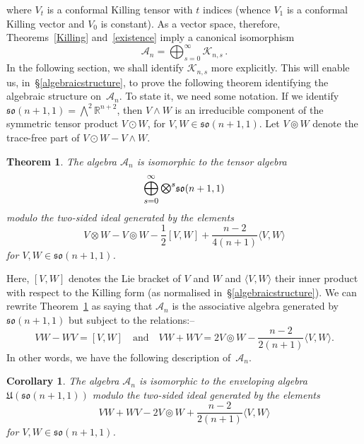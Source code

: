 \documentclass[a4paper,12pt]{amsart}
\newtheorem{thm}{Theorem}
\newtheorem{cor}{Corollary}
\newcommand{\topten}{\circledcirc}
\begin{document}
where $V_t$ is a conformal Killing tensor with $t$ indices (whence $V_1$ is a
conformal Killing vector and $V_0$ is constant). As a vector space, therefore,
Theorems~\ref{Killing} and~\ref{existence} imply a canonical isomorphism
$${\mathcal A}_n=\bigoplus_{s=0}^\infty\mathcal K_{n,s}\,.$$
In the following section, we shall identify ${\mathcal K}_{n,s}$ more
explicitly. This will enable us, in~\S\ref{algebraicstructure}, to prove the
following theorem identifying the algebraic structure on~${\mathcal A}_n$. To
state it, we need some notation. If we identify
${\mathfrak{so}}(n+1,1)=\bigwedge^2{\mathbb R}^{n+2}$, then $V\wedge W$ is an
irreducible component of the symmetric tensor product $V\odot W$, for
$V,W\in{\mathfrak{so}}(n+1,1)$. Let $V\topten W$ denote the trace-free part of
$V\odot W-V\wedge W$.
\begin{thm}\label{structure} The algebra ${\mathcal A}_n$ is isomorphic to the
tensor algebra
$$\mbox{\large$\displaystyle \bigoplus_{s=0}^\infty
\textstyle\bigotimes^s$}{\mathfrak{so}}(n+1,1)$$
modulo the two-sided ideal generated by the elements
\begin{equation}\label{generators}V\otimes W-V\topten W-\frac{1}{2}[V,W]
+\frac{n-2}{4(n+1)}\langle V,W\rangle\end{equation}
for $V,W\in{\mathfrak{so}}(n+1,1)$.
\end{thm}
\noindent Here, $[V,W]$ denotes the Lie bracket of $V$ and $W$ and
$\langle V,W\rangle$ their inner product with respect to the Killing form (as
normalised in~\S\ref{algebraicstructure}).
We can rewrite Theorem~\ref{structure} as saying that ${\mathcal A}_n$ is the
associative algebra generated by ${\mathfrak{so}}(n+1,1)$ but subject to the
relations:--
$$VW-WV=[V,W]\quad\mbox{and}\quad
  VW+WV=2V\topten W-\frac{n-2}{2(n+1)}\langle V,W\rangle.$$
In other words, we have the following description of~${\mathcal A}_n$.
\begin{cor}\label{Aasalgebra}The algebra ${\mathcal A}_n$ is isomorphic to the
enveloping algebra ${\mathfrak U}({\mathfrak{so}}(n+1,1))$ modulo the
two-sided ideal generated by the elements
$$VW+WV-2V\topten W+\frac{n-2}{2(n+1)}\langle V,W\rangle$$
for $V,W\in{\mathfrak{so}}(n+1,1)$.
\end{cor}
\end{document}
